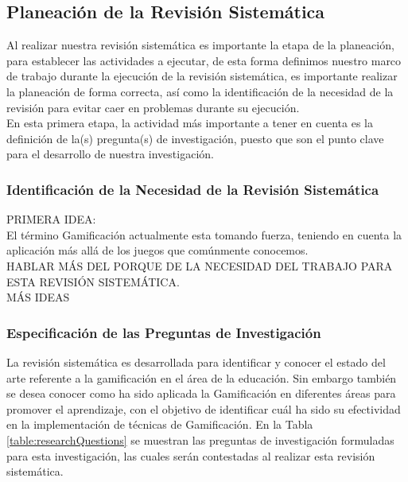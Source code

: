 \documentclass[fleqn,10pt]{SelfArx} %
\begin{document}

	\subsection{Planeación de la Revisión Sistemática}
	Al realizar nuestra revisión sistemática es importante la etapa de la planeación, para establecer las actividades a ejecutar, de esta forma definimos nuestro marco de trabajo durante la ejecución de la revisión sistemática, es importante realizar la planeación de forma correcta, así como la identificación de la necesidad de la revisión para evitar caer en problemas durante su ejecución.\\
	En esta primera etapa, la actividad más importante a tener en cuenta es la definición de la(s) pregunta(s) de investigación, puesto que son el punto clave para el desarrollo de nuestra investigación.
	

	\subsubsection{Identificación de la Necesidad de la Revisión Sistemática}
PRIMERA IDEA:\\	
	El término Gamificación actualmente esta tomando fuerza, teniendo en cuenta la aplicación más allá de los juegos que comúnmente conocemos. 
	\\HABLAR MÁS DEL PORQUE DE LA NECESIDAD DEL TRABAJO PARA ESTA REVISIÓN SISTEMÁTICA.
	\\
	MÁS IDEAS\\


	\subsubsection{Especificación de las Preguntas de Investigación}
    La revisión sistemática es desarrollada para identificar y conocer el estado del arte referente a la gamificación en el área de la educación. Sin embargo también se desea conocer como ha sido aplicada la Gamificación en diferentes áreas para promover el aprendizaje, con el objetivo de identificar cuál ha sido su efectividad en la implementación de técnicas de Gamificación. En la Tabla \ref{table:researchQuestions} se muestran las preguntas de investigación formuladas para esta investigación, las cuales serán contestadas al realizar esta revisión sistemática.\\
\end{document}
